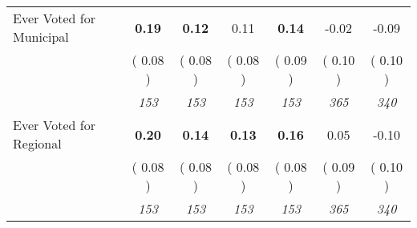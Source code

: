 \begin{tabular}{l c c c c c c}
Ever Voted for Municipal & \textbf{      0.19 } & \textbf{      0.12 } &      0.11 & \textbf{     0.14} &     -0.02 &     -0.09 \\
& (     0.08 ) & (     0.08 ) & (     0.08 ) & (     0.09 ) & (     0.10 ) & (     0.10 ) \\
& \textit{ 153 } & \textit{ 153 } & \textit{ 153 } & \textit{ 153 } & \textit{ 365 } & \textit{ 340 } \\
Ever Voted for Regional & \textbf{      0.20 } & \textbf{      0.14 } & \textbf{      0.13 } & \textbf{     0.16} &      0.05 &     -0.10 \\
& (     0.08 ) & (     0.08 ) & (     0.08 ) & (     0.08 ) & (     0.09 ) & (     0.10 ) \\
& \textit{ 153 } & \textit{ 153 } & \textit{ 153 } & \textit{ 153 } & \textit{ 365 } & \textit{ 340 } \\
\bottomrule
\end{tabular}
